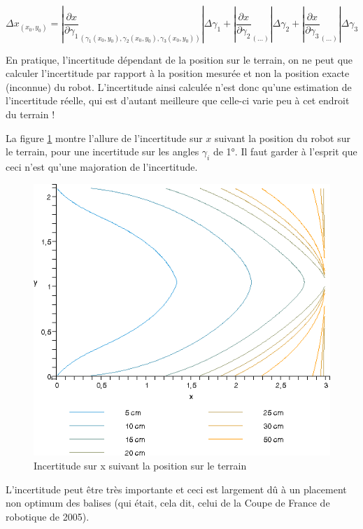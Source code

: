 \documentclass[a4paper]{article}
\begin{document}
\[\Delta x_{(x_{0}, y_{0})}=\left|\frac{\partial x}{\partial \gamma_{1}}_{(\gamma_{1}(x_{0}, y_{0}), \gamma_{2}(x_{0}, y_{0}), \gamma_{3}(x_{0}, y_{0}))}\right| \Delta \gamma_{1}+\left|\frac{\partial x}{\partial \gamma_{2}}_{(...)}\right| \Delta \gamma_{2}+\left|\frac{\partial x}{\partial \gamma_{3}}_{(...)}\right| \Delta \gamma_{3}\]

En pratique, l'incertitude dépendant de la position sur le terrain, on ne peut que calculer l'incertitude par rapport à la position mesurée et non la position exacte (inconnue) du robot. L'incertitude ainsi calculée n'est donc qu'une estimation de l'incertitude réelle, qui est d'autant meilleure que celle-ci varie peu à cet endroit du terrain !

La figure \ref{Incertitude_sur_x_triangularisation} montre l'allure de l'incertitude sur $x$ suivant la position du robot sur le terrain, pour une incertitude sur les angles $\gamma_{i}$ de 1°. Il faut garder à l'esprit que ceci n'est qu'une majoration de l'incertitude.

\begin{figure}[H]
	\centering
	\includegraphics[scale=0.75]{Images/Incertitude_sur_x_triangularisation.png}
	\caption{Incertitude sur x suivant la position sur le terrain
		\label{Incertitude_sur_x_triangularisation}}
\end{figure}

L'incertitude peut être très importante et ceci est largement dû à un placement non optimum des balises (qui était, cela dit, celui de la Coupe de France de robotique de 2005).
\end{document}
